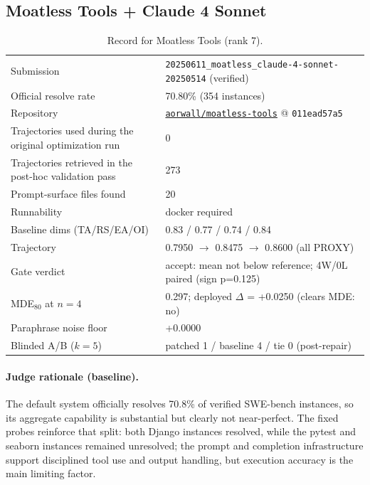 \subsection{Moatless Tools + Claude 4 Sonnet}
\label{app:agent7}
\begin{table}[h]\centering\scriptsize
\caption{Record for Moatless Tools (rank 7).}
\begin{tabular}{lp{8.2cm}}\toprule
Submission & \texttt{20250611\_\allowbreak{}moatless\_\allowbreak{}claude-4-sonnet-20250514} (verified) \\
Official resolve rate & 70.80\% (354 instances) \\
Repository & \href{https://github.com/aorwall/moatless-tools}{\texttt{aorwall/moatless-tools}} @ \texttt{011ead57a5} \\
Trajectories used during the original optimization run & 0 \\
Trajectories retrieved in the post-hoc validation pass & 273 \\
Prompt-surface files found & 20 \\
Runnability & docker required \\
Baseline dims (TA/RS/EA/OI) & 0.83 / 0.77 / 0.74 / 0.84 \\
Trajectory & 0.7950 $\to$ 0.8475 $\to$ 0.8600 (all PROXY) \\
Gate verdict & accept: mean not below reference; 4W/0L paired (sign p=0.125) \\
MDE$_{80}$ at $n{=}4$ & 0.297; deployed $\Delta$ = +0.0250 (clears MDE: no) \\
Paraphrase noise floor & +0.0000 \\
Blinded A/B ($k{=}5$) & patched 1 / baseline 4 / tie 0 (post-repair) \\
\bottomrule\end{tabular}\end{table}
\paragraph{Judge rationale (baseline).}
The default system officially resolves 70.8\% of verified SWE-bench instances, so its aggregate capability is substantial but clearly not near-perfect. The fixed probes reinforce that split: both Django instances resolved, while the pytest and seaborn instances remained unresolved; the prompt and completion infrastructure support disciplined tool use and output handling, but execution accuracy is the main limiting factor.
